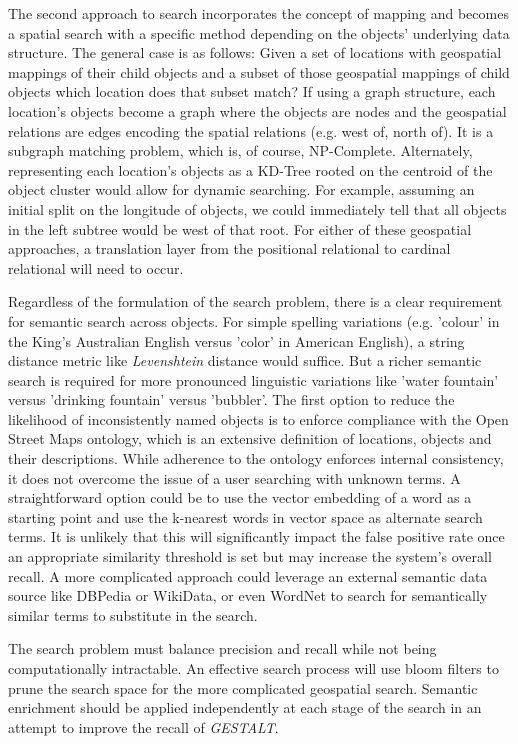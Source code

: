 The second approach to search incorporates the concept of mapping and becomes a spatial search with a specific method depending on the objects' underlying data structure. 
The general case is as follows: Given a set of locations with geospatial mappings of their child objects and a subset of those geospatial mappings of child objects which location does that subset match? 
If using a graph structure, each location's objects become a graph where the objects are nodes and the geospatial relations are edges encoding the spatial relations (e.g. west of, north of). It is a subgraph matching problem, which is, of course, NP-Complete. 
Alternately, representing each location's objects as a KD-Tree rooted on the centroid of the object cluster would allow for dynamic searching. For example, assuming an initial split on the longitude of objects, we could immediately tell that all objects in the left subtree would be west of that root. 
For either of these geospatial approaches, a translation layer from the positional relational to cardinal relational will need to occur.

Regardless of the formulation of the search problem, there is a clear requirement for semantic search across objects. For simple spelling variations (e.g. 'colour' in the King's Australian English versus 'color' in American English), a string distance metric like \textit{Levenshtein} distance would suffice. 
But a richer semantic search is required for more pronounced linguistic variations like 'water fountain' versus 'drinking fountain' versus 'bubbler'. 
The first option to reduce the likelihood of inconsistently named objects is to enforce compliance with the Open Street Maps ontology, which is an extensive definition of locations, objects and their descriptions. 
While adherence to the ontology enforces internal consistency, it does not overcome the issue of a user searching with unknown terms. 
A straightforward option could be to use the vector embedding of a word as a starting point and use the k-nearest words in vector space as alternate search terms. 
It is unlikely that this will significantly impact the false positive rate once an appropriate similarity threshold is set but may increase the system's overall recall. 
A more complicated approach could leverage an external semantic data source like DBPedia or WikiData, or even WordNet to search for semantically similar terms to substitute in the search. 

The search problem must balance precision and recall while not being computationally intractable. An effective search process will use bloom filters to prune the search space for the more complicated geospatial search. Semantic enrichment should be applied independently at each stage of the search in an attempt to improve the recall of \textit{GESTALT}.

